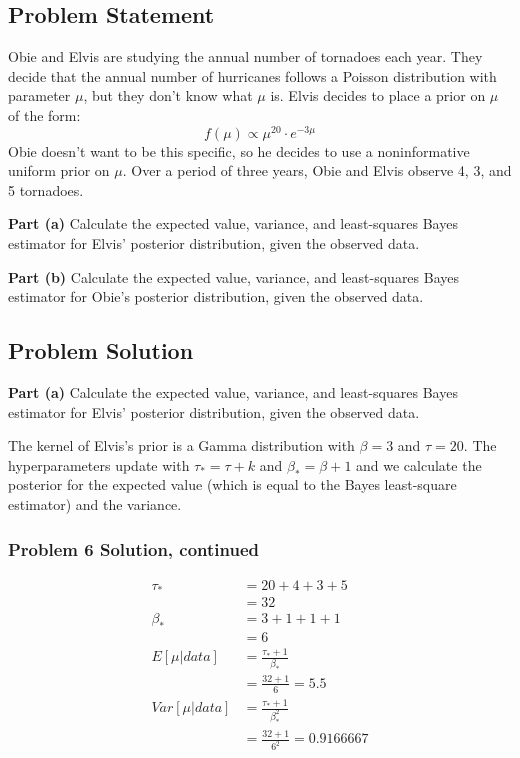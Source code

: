 \documentclass[12pt]{article}
\theoremstyle{definition}
\begin{document}
\subsection*{Problem Statement}

Obie and Elvis are studying the annual number of tornadoes each year. They decide that the annual number of hurricanes follows a Poisson distribution with parameter $\mu$, but they don't know what $\mu$ is. Elvis decides to place a prior on $\mu$ of the form:
$$
f(\mu) \propto \mu^{20} \cdot e^{-3 \mu}
$$
Obie doesn't want to be this specific, so he decides to use a noninformative uniform prior on $\mu$. Over a period of three years, Obie and Elvis observe 4, 3, and 5 tornadoes.

\bigskip
\noindent
{\bf Part (a)} Calculate the expected value, variance, and least-squares Bayes estimator for Elvis' posterior distribution, given the observed data.

\bigskip
\noindent
{\bf Part (b)} Calculate the expected value, variance, and least-squares Bayes estimator for Obie's posterior distribution, given the observed data.


\subsection*{Problem Solution}
\bigskip
\noindent
{\bf Part (a)} Calculate the expected value, variance, and least-squares Bayes estimator for Elvis' posterior distribution, given the observed data.

The kernel of Elvis's prior is a Gamma distribution with $\beta = 3$ and $\tau = 20$.
The hyperparameters update with $\tau_* = \tau + k$ and $\beta_* = \beta + 1$ and we calculate the posterior for the expected value (which is equal to the Bayes least-square estimator) and the variance.



\newpage
\subsubsection*{Problem 6 Solution, continued}
\begin{align*}
\tau_* &= 20 + 4 + 3 + 5\\
&= 32\\
\beta_* &= 3 + 1 + 1 + 1\\
&= 6\\
E[\mu|data] &= \frac{\tau_* + 1}{\beta_*}\\
&= \frac{32 + 1}{6} = 5.5\\
Var[\mu|data] &= \frac{\tau_* + 1}{\beta_*^2}\\
&= \frac{32 + 1}{6^2} = 0.9166667
\end{align*}
\end{document}
